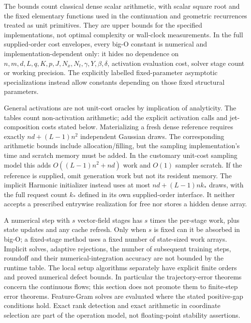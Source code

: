 
The bounds count classical dense scalar arithmetic, with scalar square root and the fixed elementary functions used in the continuation and geometric recurrences treated as unit primitives. They are upper bounds for the specified implementations, not optimal complexity or wall-clock measurements. In the full supplied-order cost envelopes, every big-O constant is numerical and implementation-dependent only: it hides no dependence on \(n,\allowbreak m,\allowbreak d,\allowbreak L,\allowbreak q,\allowbreak K,\allowbreak p,\allowbreak J,\allowbreak N_x,\allowbreak N_t,\allowbreak \gamma,\allowbreak Y,\allowbreak \beta,\allowbreak \delta\), activation evaluation cost, solver stage count or working precision. The explicitly labelled fixed-parameter asymptotic specializations instead allow constants depending on those fixed structural parameters.



General activations are not unit-cost oracles by implication of analyticity. The tables count non-activation arithmetic; add the explicit activation calls and jet-composition costs stated below. Materializing a fresh dense reference requires exactly \(nd+(L-1)n^2\) independent Gaussian draws. The corresponding arithmetic bounds include allocation/filling, but the sampling implementation's time and scratch memory must be added. In the customary unit-cost sampling model this adds \(O((L-1)n^2+nd)\) work and \(O(1)\) sampler scratch. If the reference is supplied, omit generation work but not its resident memory. The implicit Harmonic initializer instead uses at most \(nd+(L-1)nk_*\) draws, with the full request count \(k_*\) defined in its own supplied-order interface. It neither accepts a prescribed entrywise realization for free nor stores a hidden dense array.



A numerical step with \(s\) vector-field stages has \(s\) times the per-stage work, plus state updates and any cache refresh. Only when \(s\) is fixed can it be absorbed in big-O; a fixed-stage method uses a fixed number of state-sized work arrays. Implicit solves, adaptive rejections, the number of subsequent training steps, roundoff and their numerical-integration accuracy are not bounded by the runtime table. The local setup algorithms separately have explicit finite orders and proved numerical defect bounds. In particular the trajectory-error theorems concern the continuous flows; this section does not promote them to finite-step error theorems. Feature-Gram solves are evaluated where the stated positive-gap conditions hold. Exact rank detection and exact arithmetic in coordinate selection are part of the operation model, not floating-point stability assertions.


